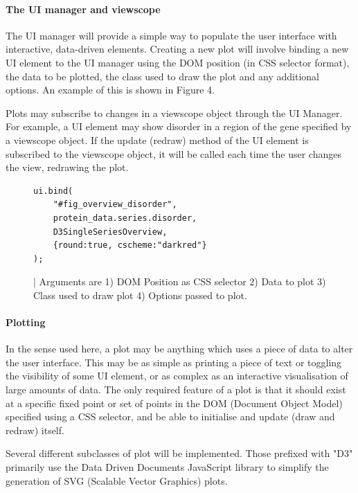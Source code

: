 \documentclass[fleqn,10pt]{article} %
\begin{document}
\paragraph{The UI manager and viewscope}

The UI manager will provide a simple way to populate the user interface with interactive, data-driven elements. Creating a new plot will involve binding a new UI element to the UI manager using the DOM position (in CSS selector format), the data to be plotted, the class used to draw the plot and any additional options. An example of this is shown in Figure 4.

Plots may subscribe to changes in a viewscope object through the UI Manager. For example, a UI element may show disorder in a region of the gene specified by a viewscope object. If the update (redraw) method of the UI element is subscribed to the viewscope object, it will be called each time the user changes the view, redrawing the plot.

\begin{figure}
\begin{lstlisting}
ui.bind(
	"#fig_overview_disorder", 
	protein_data.series.disorder,
	D3SingleSeriesOverview, 
	{round:true, cscheme:"darkred"} 
);
\end{lstlisting}
\caption{ | Arguments are 1) DOM Position as CSS selector 2) Data to plot 3) Class used to draw plot 4) Options passed to plot.}
\end{figure}

\paragraph{Plotting}

In the sense used here, a plot may be anything which uses a piece of data to alter the user interface. This may be as simple as printing a piece of text or toggling the visibility of some UI element, or as complex as an interactive visualisation of large amounts of data. The only required feature of a plot is that it should exist at a specific fixed point or set of points in the DOM (Document Object Model) specified using a CSS selector, and be able to initialise and update (draw and redraw) itself.

Several different subclasses of plot will be implemented. Those prefixed with "D3" primarily use the Data Driven Documents JavaScript library to simplify the generation of SVG (Scalable Vector Graphics) plots.
\end{document}
